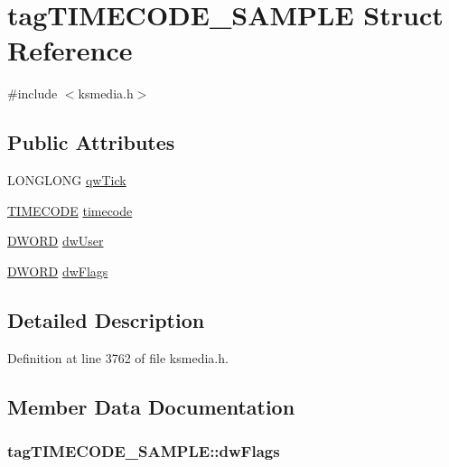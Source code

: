 \hypertarget{structtag_t_i_m_e_c_o_d_e___s_a_m_p_l_e}{}\section{tag\+T\+I\+M\+E\+C\+O\+D\+E\+\_\+\+S\+A\+M\+P\+LE Struct Reference}
\label{structtag_t_i_m_e_c_o_d_e___s_a_m_p_l_e}


{\ttfamily \#include $<$ksmedia.\+h$>$}

\subsection*{Public Attributes}
\begin{DoxyCompactItemize}
\item 
L\+O\+N\+G\+L\+O\+NG \hyperlink{structtag_t_i_m_e_c_o_d_e___s_a_m_p_l_e_a73ed76bba92ffdec34b564ae48df4124}{qw\+Tick}
\item 
\hyperlink{ksmedia_8h_a9a62ab0556a4f8fbd43ba64f6bd25f62}{T\+I\+M\+E\+C\+O\+DE} \hyperlink{structtag_t_i_m_e_c_o_d_e___s_a_m_p_l_e_ae351cb403b3c30f69c934a012a0eef36}{timecode}
\item 
\hyperlink{mapinls_8h_ad342ac907eb044443153a22f964bf0af}{D\+W\+O\+RD} \hyperlink{structtag_t_i_m_e_c_o_d_e___s_a_m_p_l_e_a6d21dcecf7f2bc9cb3d38eb1c2acb6da}{dw\+User}
\item 
\hyperlink{mapinls_8h_ad342ac907eb044443153a22f964bf0af}{D\+W\+O\+RD} \hyperlink{structtag_t_i_m_e_c_o_d_e___s_a_m_p_l_e_ac0e36d0bf1f824dd47b0d2c268c9e0af}{dw\+Flags}
\end{DoxyCompactItemize}


\subsection{Detailed Description}


Definition at line 3762 of file ksmedia.\+h.



\subsection{Member Data Documentation}
\subsubsection[{\texorpdfstring{dw\+Flags}{dwFlags}}]{ tag\+T\+I\+M\+E\+C\+O\+D\+E\+\_\+\+S\+A\+M\+P\+L\+E\+::dw\+Flags}\hypertarget{structtag_t_i_m_e_c_o_d_e___s_a_m_p_l_e_ac0e36d0bf1f824dd47b0d2c268c9e0af}{}\label{structtag_t_i_m_e_c_o_d_e___s_a_m_p_l_e_ac0e36d0bf1f824dd47b0d2c268c9e0af}


